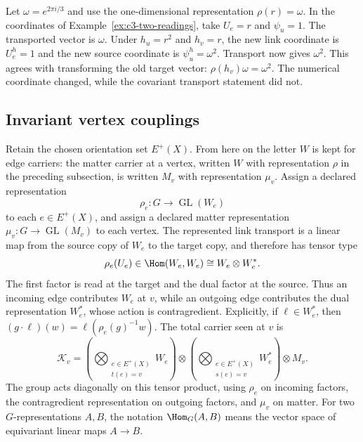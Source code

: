 \begin{example}
Let $\omega=e^{2\pi i/3}$ and use the one-dimensional representation
$\rho(r)=\omega$.  In the coordinates of Example~\ref{ex:c3-two-readings}, take
$U_e=r$ and $\psi_u=1$.  The transported vector is $\omega$.  Under
$h_u=r^2$ and $h_v=r$, the new link coordinate is $U_e^h=1$ and the new
source coordinate is $\psi_u^h=\omega^2$.  Transport now gives $\omega^2$.
This agrees with transforming the old target vector:
$\rho(h_v)\omega=\omega^2$.  The numerical coordinate changed, while the
covariant transport statement did not.
\end{example}

\subsection{Invariant vertex couplings}

Retain the chosen orientation set $E^+(X)$.  From here on the letter $W$ is
kept for edge carriers: the matter carrier at a vertex, written $W$ with
representation $\rho$ in the preceding subsection, is written $M_v$ with
representation $\mu_v$.  Assign a
declared representation
\[
 \rho_e:G\longrightarrow\operatorname{GL}(W_e)
\]
to each $e\in E^+(X)$, and assign a declared matter representation
$\mu_v:G\to\operatorname{GL}(M_v)$ to each vertex.  The represented link
transport is a linear map from the
source copy of $W_e$ to the target copy, and therefore has tensor type
\[
 \rho_e(U_e)\in\Hom(W_e,W_e)\cong W_e\otimes W_e^*.
\]
The first factor is read at the target and the dual factor at the source.
Thus an incoming edge contributes $W_e$ at $v$, while an outgoing edge
contributes the dual representation $W_e^*$, whose action is contragredient.
Explicitly, if $\ell\in W_e^*$, then
$(g\cdot\ell)(w)=\ell(\rho_e(g)^{-1}w)$.
The total carrier seen at $v$ is
\[
 \mathcal K_v=
 \left(\bigotimes_{\substack{e\in E^+(X)\\t(e)=v}}W_e\right)
 \otimes
 \left(\bigotimes_{\substack{e\in E^+(X)\\s(e)=v}}W_e^*\right)
 \otimes M_v.
\]
The group acts diagonally on this tensor product, using $\rho_e$ on incoming
factors, the contragredient representation on outgoing factors, and $\mu_v$
on matter.  For two $G$-representations $A,B$, the notation $\Hom_G(A,B)$
means the vector space of equivariant linear maps $A\to B$.

